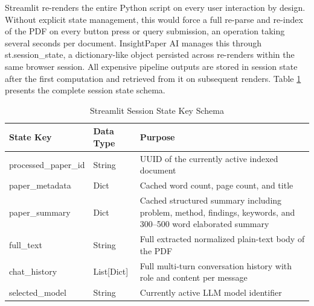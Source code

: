 Streamlit re-renders the entire Python script on every user interaction by design. Without explicit state management, this would force a full re-parse and re-index of the PDF on every button press or query submission, an operation taking several seconds per document.
\newline \newline InsightPaper AI manages this through st.session\_state, a dictionary-like object persisted across re-renders within the same browser session. All expensive pipeline outputs are stored in session state after the first computation and retrieved from it on subsequent renders. Table \ref{tab:state} presents the complete session state schema.

\begin{table}[H]

\centering

\caption{Streamlit Session State Key Schema}

\label{tab:state}

\begin{tabular}{|p{3.5cm}|p{2.5cm}|p{7cm}|}

\hline

\textbf{State Key} & \textbf{Data Type} & \textbf{Purpose} \\

\hline

processed\_paper\_id & String & UUID of the currently active indexed document \\

\hline

paper\_metadata & Dict & Cached word count, page count, and title \\

\hline

paper\_summary & Dict & Cached structured summary including problem, method, findings, keywords, and 300–500 word elaborated summary \\

\hline

full\_text & String & Full extracted normalized plain-text body of the PDF \\

\hline

chat\_history & List[Dict] & Full multi-turn conversation history with role and content per message \\

\hline

selected\_model & String & Currently active LLM model identifier \\


\end{tabular}
\end{table}
